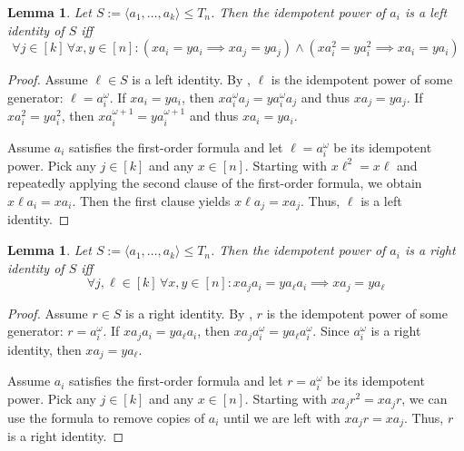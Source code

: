 \documentclass{amsart}
\newtheorem{lemma}[theorem]{Lemma}
\theoremstyle{remark}
\numberwithin{equation}{section}
\begin{document}
\begin{lemma} \label{lem:leftid}
Let $S := \langle a_1, \dots, a_k \rangle \leq T_n$. Then the idempotent power of $a_i$ is a left identity of $S$ iff
\[ \forall j \in [k] \, \forall x,y \in [n]: (x a_i = y a_i \implies x a_j = y a_j) \wedge (x a_i^2 = y a_i^2 \implies x a_i = y a_i) \]
\end{lemma}
\begin{proof}
Assume $\ell \in S$ is a left identity. By \cite[Lemma 6.1]{FJ:CP}, $\ell$ is the idempotent power of some generator: $\ell = a_i^\omega$. If $x a_i = y a_i$, then $x a_i^\omega a_j = y a_i^\omega a_j$ and thus $x a_j = y a_j$. If $x a_i^2 = y a_i^2$, then $x a_i^{\omega+1} = y a_i^{\omega+1}$ and thus $x a_i = y a_i$.

Assume $a_i$ satisfies the first-order formula and let $\ell = a_i^\omega$ be its idempotent power. Pick any $j \in [k]$ and any $x \in [n]$. Starting with $x\ell^2 = x\ell$ and repeatedly applying the second clause of the first-order formula, we obtain $x\ell a_i = x a_i$. Then the first clause yields $x\ell a_j = x a_j$. Thus, $\ell$ is a left identity.
\end{proof}

\begin{lemma} \label{lem:rightid}
Let $S := \langle a_1, \dots, a_k \rangle \leq T_n$. Then the idempotent power of $a_i$ is a right identity of $S$ iff
\[ \forall j,\ell \in [k] \, \forall x,y \in [n]: x a_j a_i = y a_\ell a_i \implies x a_j = y a_\ell \]
\end{lemma}
\begin{proof}
Assume $r \in S$ is a right identity. By \cite[Lemma 6.3]{FJ:CP}, $r$ is the idempotent power of some generator: $r = a_i^\omega$. If $xa_j a_i = y a_\ell a_i$, then $xa_j a_i^\omega = y a_\ell a_i^\omega$. Since $a_i^\omega$ is a right identity, then $xa_j = y a_\ell$.

Assume $a_i$ satisfies the first-order formula and let $r = a_i^\omega$ be its idempotent power. Pick any $j \in [k]$ and any $x \in [n]$. Starting with $xa_jr^2 = xa_jr$, we can use the formula to remove copies of $a_i$ until we are left with $xa_jr = xa_j$. Thus, $r$ is a right identity.
\end{proof}
\end{document}
